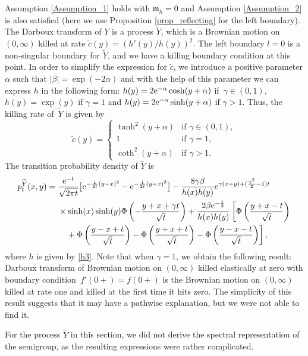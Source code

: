 \documentclass[pdftex]{sigma}
\numberwithin{equation}{section}
\theoremstyle{definition}
\begin{document}
Assumption \ref{Assumption_1} holds with ${\mathfrak m}_h=0$ and Assumption \ref{Assumption_2} is also satisfied (here we use Proposition \ref{prop_reflecting} for the left boundary). The Darboux transform of $Y$ is a process $\widetilde Y$, which is a Brownian motion on $(0,\infty)$ killed at rate $\tilde c(y)=(h'(y)/h(y))^2$. The left boundary $l=0$ is a non-singular boundary for $\widetilde Y$, and we have a killing boundary condition at this point. In order to simplify the expression for $\tilde c$, we introduce a positive parameter $\alpha$ such that $|\beta|=\exp(-2 \alpha)$ and with the help of this parameter we can express $h$ in the following form: $h(y)=2 {\rm e}^{-\alpha} \cosh(y+\alpha)$ if~${\gamma \in (0,1)}$, $h(y)=\exp(y)$ if $\gamma=1$ and $h(y)=2 {\rm e}^{-\alpha} \sinh(y+\alpha)$ if $\gamma>1$. Thus, the killing rate of~$\widetilde Y$ is given by
\[
\tilde c(y)=
\begin{cases}
\tanh^2(y+\alpha) &\text{if }  \gamma \in (0,1),\\
1  &\text{if }  \gamma=1,\\
\coth^2(y+\alpha)  &\text{if }  \gamma>1.
\end{cases}
\]
The transition probability density of $\widetilde Y$ is
\begin{align}
p^{\widetilde Y}_t(x,y)={}&\frac{{\rm e}^{-t}}{\sqrt{2 \pi t}}\big[ {\rm e}^{-\frac{1}{2t}(y-x)^2}-{\rm e}^{-\frac{1}{2t}(y+x)^2} \big]-\frac{8\gamma \beta}{h(x)h(y)} {\rm e}^{\gamma(x+y)+(\frac{\gamma^2}{2}-1)t}\nonumber\\
&\times\sinh(x) \sinh(y) \Phi\left(-\frac{y+x+\gamma t}{\sqrt{t}}\right)+\frac{2\beta {\rm e}^{-\frac{t}{2}}}{h(x)h(y)} \left[\Phi\left(\frac{y+x-t}{\sqrt{t}}\right)
\right.\nonumber\\
&\left.\phantom{\times}{}+\Phi\left(\frac{y-x+t}{\sqrt{t}}\right)-\Phi\left(\frac{y+x+t}{\sqrt{t}}\right)-\Phi\left(\frac{y-x-t}{\sqrt{t}}\right)\right],\label{p_tilde_Y3}
\end{align}
where $h$ is given by \eqref{h3}. Note that when $\gamma=1$, we obtain the following result: Darboux transform of Brownian motion on $(0,\infty)$ killed elastically at zero with boundary condition~${f'(0+)=f(0+)}$ is the Brownian motion on $(0,\infty)$ killed at rate one and killed at the first time it hits zero. The simplicity of this result suggests that it may have a pathwise explanation, but we were not able to find it.

For the process $\tilde Y$ in this section, we did not derive the spectral representation of the semigroup, as the resulting expressions were rather complicated.
\end{document}
